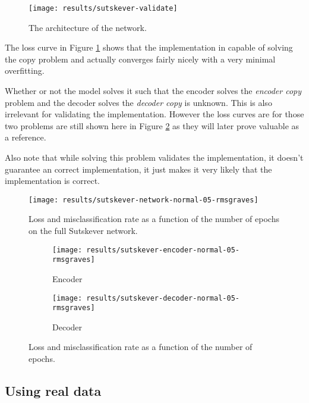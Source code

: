 \begin{figure}[H]
	\centering
	\texttt{[image: results/sutskever-validate]}
	\caption{The architecture of the network.}
\end{figure}

The loss curve in Figure \ref{fig:results:sutskever:network-05} shows that the implementation in capable of solving the copy problem and actually converges fairly nicely with a very minimal overfitting.

Whether or not the model solves it such that the encoder solves the \textit{encoder copy} problem and the decoder solves the \textit{decoder copy} is unknown. This is also irrelevant for validating the implementation. However the loss curves are for those two problems are still shown here in Figure \ref{fig:results:sutskever:decoder-encoder-05} as they will later prove valuable as a reference.

Also note that while solving this problem validates the implementation, it doesn't guarantee an correct implementation, it just makes it very likely that the implementation is correct.

\begin{figure}[h]
	\centering
	\texttt{[image: results/sutskever-network-normal-05-rmsgraves]}
	\caption{Loss and misclassification rate as a function of the number of epochs on the full Sutskever network.}
	\label{fig:results:sutskever:network-05}
\end{figure}
\begin{figure}[H]
        \vspace{-0.5cm}
        \centering
        \begin{subfigure}[b]{0.49\textwidth}
                \texttt{[image: results/sutskever-encoder-normal-05-rmsgraves]}
                \caption{Encoder}
        \end{subfigure}
        \begin{subfigure}[b]{0.49\textwidth}
                \texttt{[image: results/sutskever-decoder-normal-05-rmsgraves]}
                \caption{Decoder}
        \end{subfigure}
        \caption{Loss and misclassification rate as a function of the number of epochs.}
        \label{fig:results:sutskever:decoder-encoder-05}
\end{figure}

\subsection{Using real data}


